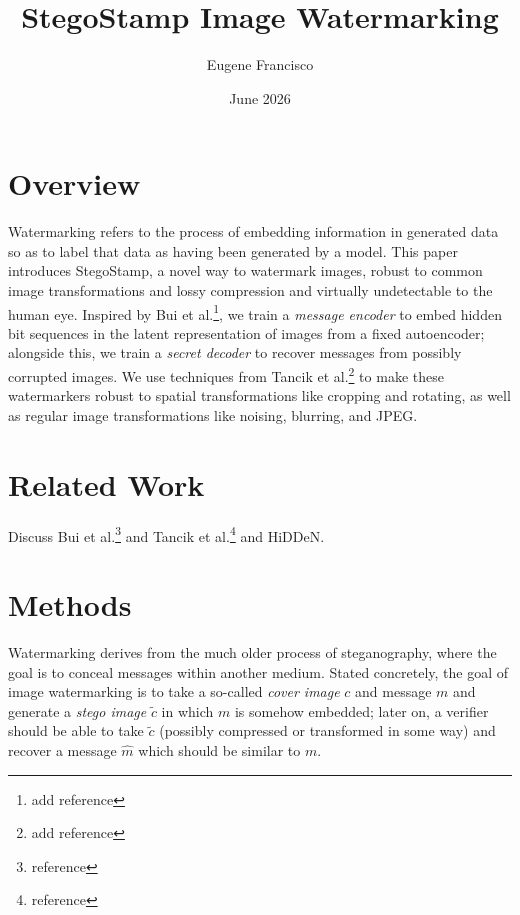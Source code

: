 \documentclass[twocolumn]{article}
\title{StegoStamp Image Watermarking}
\author{Eugene Francisco}
\date{June 2026}
\begin{document}
\maketitle

\section{Overview}
Watermarking refers to the process of embedding information in generated data so as to label that data as having been generated by a model. This paper introduces StegoStamp, a novel way to watermark images, robust to common image transformations and lossy compression and virtually undetectable to the human eye. Inspired by Bui et al.\footnote{\TODO add reference}, we train a \textit{message encoder} to embed hidden bit sequences in the latent representation of images from a fixed autoencoder; alongside this, we train a \textit{secret decoder} to recover messages from possibly corrupted images. We use techniques from Tancik et al.\footnote{\TODO add reference} to make these watermarkers robust to spatial transformations like cropping and rotating, as well as regular image transformations like noising, blurring, and JPEG.

\section{Related Work}
Discuss Bui et al.\footnote{\TODO reference} and Tancik et al.\footnote{\TODO reference} and HiDDeN.

\section{Methods}
Watermarking derives from the much older process of steganography, where the goal is to conceal messages within another medium. Stated concretely, the goal of image watermarking is to take a so-called \textit{cover image} $c$ and message $m$ and generate a \textit{stego image} $\tilde c$ in which $m$ is somehow embedded; later on, a verifier should be able to take $\tilde c$ (possibly compressed or transformed in some way) and recover a message $\hat m$ which should be similar to $m$.
\end{document}
